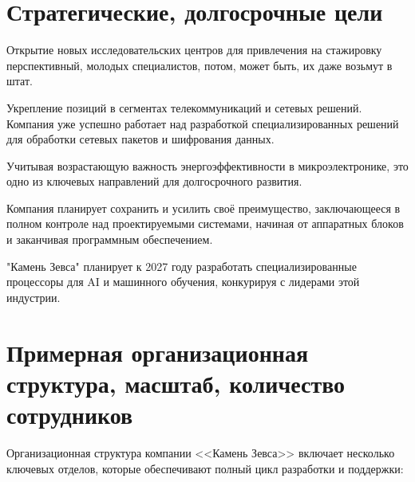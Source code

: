 \section{Стратегические, долгосрочные цели}

Открытие новых исследовательских центров
для привлечения на стажировку перспективный, молодых специалистов,
потом, может быть, их даже возьмут в штат.\par
Укрепление позиций в сегментах телекоммуникаций и сетевых решений.
Компания уже успешно работает над разработкой специализированных решений
для обработки сетевых пакетов и шифрования данных.\par
Учитывая возрастающую важность энергоэффективности в микроэлектронике,
это одно из ключевых направлений для долгосрочного развития.\par
Компания планирует сохранить и усилить своё преимущество,
заключающееся в полном контроле над проектируемыми системами,
начиная от аппаратных блоков и заканчивая программным обеспечением.\par
"Камень Зевса" планирует к 2027 году разработать специализированные
процессоры для AI и машинного обучения,
конкурируя с лидерами этой индустрии.\par

\section{Примерная организационная структура, масштаб, количество сотрудников}

Организационная структура компании <<Камень Зевса>>
включает несколько ключевых отделов,
которые обеспечивают полный цикл разработки и поддержки:

